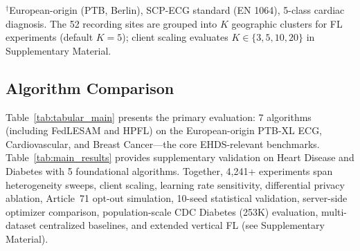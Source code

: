 \documentclass[conference,a4paper]{IEEEtran}
\begin{document}
\begin{table}[htbp]
\centering
\caption{Evaluated Dataset Coverage}
\label{tab:dataset_coverage}

\vspace{1mm}
\footnotesize{$^\dagger$European-origin (PTB, Berlin), SCP-ECG standard (EN 1064), 5-class cardiac diagnosis. The 52 recording sites are grouped into $K$ geographic clusters for FL experiments (default $K{=}5$); client scaling evaluates $K \in \{3, 5, 10, 20\}$ in Supplementary Material.}
\end{table}

\subsection{Algorithm Comparison}

Table~\ref{tab:tabular_main} presents the primary evaluation: 7 algorithms (including FedLESAM and HPFL) on the European-origin PTB-XL ECG, Cardiovascular, and Breast Cancer---the core EHDS-relevant benchmarks. Table~\ref{tab:main_results} provides supplementary validation on Heart Disease and Diabetes with 5 foundational algorithms. Together, 4,241+ experiments span heterogeneity sweeps, client scaling, learning rate sensitivity, differential privacy ablation, Article~71 opt-out simulation, 10-seed statistical validation, server-side optimizer comparison, population-scale CDC Diabetes (253K) evaluation, multi-dataset centralized baselines, and extended vertical FL (see Supplementary Material).
\end{document}
